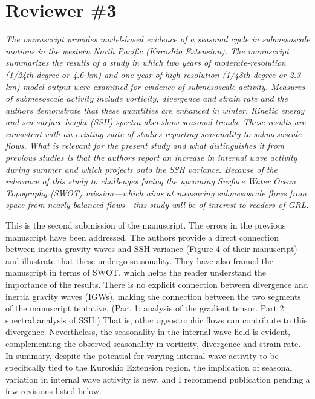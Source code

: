 \documentclass[11pt]{article}
\begin{document}
\section{Reviewer \#3}

{\it The manuscript provides model-based evidence of a seasonal cycle in submesoscale motions
in the western North Pacific (Kuroshio Extension). The manuscript summarizes the results of
a study in which two years of moderate-resolution (1/24th degree or 4.6 km) and one year of
high-resolution (1/48th degree or 2.3 km) model output were examined for evidence of
submesoscale activity. Measures of submesoscale activity include vorticity, divergence and
strain rate and the authors demonstrate that these quantities are enhanced in winter. Kinetic
energy and sea surface height (SSH) spectra also show seasonal trends. These results are
consistent with an existing suite of studies reporting seasonality to submesoscale flows. What
is relevant for the present study and what distinguishes it from previous studies is that the
authors report an increase in internal wave activity during summer and which projects onto
the SSH variance. Because of the relevance of this study to challenges facing the upcoming
Surface Water Ocean Topography (SWOT) mission—which aims at measuring submesoscale
flows from space from nearly-balanced flows—this study will be of interest to readers of
GRL.


This is the second submission of the manuscript. The errors in the previous manuscript have
been addressed. The authors provide a direct connection between inertia-gravity waves and
SSH variance (Figure 4 of their manuscript) and illustrate that these undergo seasonality.
They have also framed the manuscript in terms of SWOT, which helps the reader understand
the importance of the results. There is no explicit connection between divergence and inertia gravity
waves (IGWs), making the connection between the two segments of the manuscript
tentative. (Part 1: analysis of the gradient tensor. Part 2: spectral analysis of SSH.) That is,
other ageostrophic flows can contribute to this divergence. Nevertheless, the seasonality in the
internal wave field is evident, complementing the observed seasonality in vorticity,
divergence and strain rate. In summary, despite the potential for varying internal wave
activity to be specifically tied to the Kuroshio Extension region, the implication of seasonal
variation in internal wave activity is new, and I recommend publication pending a few
revisions listed below.}
\end{document}
